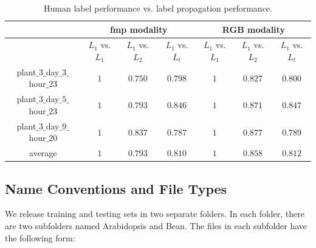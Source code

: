 \begin{figure}
\begin{centering}
\label{fig:LabelAlignment}
\end{centering}
\end{figure}




\begin{table}[t]
\centering
\caption{Human label performance vs. label propagation performance.}
\begin{tabular}{c|c|c|c|c|c|c}
\hline
    & \multicolumn{3}{c|}{fmp modality} & \multicolumn{3}{c}{RGB modality}\\ \hline
    & $L_1$ vs. $L_1$ & $L_1$ vs. $L_2$  & $L_1$ vs. $L_t$ & $L_1$ vs. $L_1$ & $L_1$ vs. $L_2$ & $L_1$ vs. $L_t$ \\ \hline
   plant$\_3\_$day$\_3\_$hour$\_23$ & $1$ & $0.750$ & $0.798$ & $1$ & $0.827$ & $0.800$ \\ \hline
   plant$\_3\_$day$\_5\_$hour$\_23$ & $1$ & $0.793$ & $0.846$ & $1$ & $0.871$ & $0.847$ \\ \hline
   plant$\_3\_$day$\_9\_$hour$\_20$ & $1$ & $0.837$ & $0.787$ & $1$ & $0.877$ & $0.789$ \\ \hline
                   average &          $1$ & $0.793$ & $0.810$ & $1$ & $0.858$ & $0.812$ \\ \hline
\end{tabular}
\label{tab:labelError}
\end{table}




\subsection{Name Conventions and File Types}
We release training and testing sets in two separate folders.
In each folder, there are two subfolders named Arabidopsis and Bean.
The files in each subfolder have the following form:

